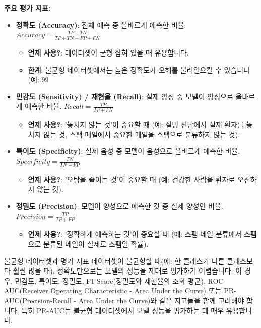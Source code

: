 \documentclass[11pt,a4paper]{article}
\begin{document}
\textbf{주요 평가 지표:}
\begin{itemize}
    \item \textbf{정확도 (Accuracy)}: 전체 예측 중 올바르게 예측한 비율.
    $Accuracy = \frac{TP + TN}{TP + TN + FP + FN}$
    \begin{itemize}
        \item \textbf{언제 사용?}: 데이터셋이 균형 잡혀 있을 때 유용합니다.
        \item \textbf{한계}: 불균형 데이터셋에서는 높은 정확도가 오해를 불러일으킬 수 있습니다 (예: 99%
    \end{itemize}

    \item \textbf{민감도 (Sensitivity) / 재현율 (Recall)}: 실제 양성 중 모델이 양성으로 올바르게 예측한 비율.
    $Recall = \frac{TP}{TP + FN}$
    \begin{itemize}
        \item \textbf{언제 사용?}: '놓치지 않는 것'이 중요할 때 (예: 질병 진단에서 실제 환자를 놓치지 않는 것, 스팸 메일에서 중요한 메일을 스팸으로 분류하지 않는 것).
    \end{itemize}

    \item \textbf{특이도 (Specificity)}: 실제 음성 중 모델이 음성으로 올바르게 예측한 비율.
    $Specificity = \frac{TN}{TN + FP}$
    \begin{itemize}
        \item \textbf{언제 사용?}: '오탐을 줄이는 것'이 중요할 때 (예: 건강한 사람을 환자로 오진하지 않는 것).
    \end{itemize}

    \item \textbf{정밀도 (Precision)}: 모델이 양성으로 예측한 것 중 실제 양성인 비율.
    $Precision = \frac{TP}{TP + FP}$
    \begin{itemize}
        \item \textbf{언제 사용?}: '정확하게 예측하는 것'이 중요할 때 (예: 스팸 메일 분류에서 스팸으로 분류된 메일이 실제로 스팸일 확률).
    \end{itemize}
\end{itemize}

\begin{warningbox}{불균형 데이터셋과 평가 지표}
데이터셋이 불균형할 때(예: 한 클래스가 다른 클래스보다 훨씬 많을 때), 정확도만으로는 모델의 성능을 제대로 평가하기 어렵습니다. 이 경우, 민감도, 특이도, 정밀도, F1-Score(정밀도와 재현율의 조화 평균), ROC-AUC(Receiver Operating Characteristic - Area Under the Curve) 또는 PR-AUC(Precision-Recall - Area Under the Curve)와 같은 지표들을 함께 고려해야 합니다. 특히 PR-AUC는 불균형 데이터셋에서 모델 성능을 평가하는 데 매우 유용합니다.
\end{warningbox}
\end{document}
